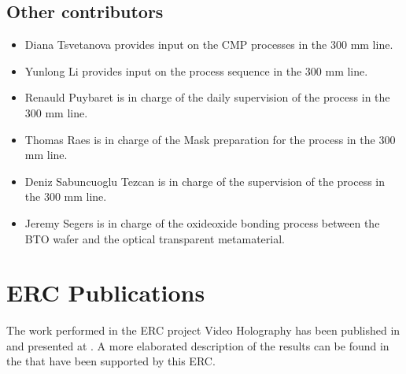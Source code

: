 \documentclass[a4paper,10pt,english,openany,oneside]{jupyterBook}
\begin{document}
\section{Other contributors}
\label{\detokenize{Team:other-contributors}}\begin{itemize}
\item {} 
\sphinxAtStartPar
Diana Tsvetanova provides input on the CMP processes in the 300 mm line.

\item {} 
\sphinxAtStartPar
Yunlong Li provides input on the process sequence in the 300 mm line.

\item {} 
\sphinxAtStartPar
Renauld Puybaret is in charge of the daily supervision of the process in the 300 mm line.

\item {} 
\sphinxAtStartPar
Thomas Raes is in charge of the Mask preparation for the process in the 300 mm line.

\item {} 
\sphinxAtStartPar
Deniz Sabuncuoglu Tezcan is in charge of the supervision of the process in the 300 mm line.

\item {} 
\sphinxAtStartPar
Jeremy Segers is in charge of the oxide\sphinxhyphen{}oxide bonding process between the BTO wafer and the optical transparent metamaterial.

\end{itemize}

\sphinxstepscope


\chapter{ERC Publications}
\label{\detokenize{Publications2:erc-publications}}\label{\detokenize{Publications2::doc}}
\sphinxAtStartPar
The work performed in the ERC project Video Holography has been published in {\hyperref[\detokenize{Publications2:journal-target}]{}} and presented at {\hyperref[\detokenize{Publications2:conferences-target}]{}}. A more elaborated description of the results can be found in the {\hyperref[\detokenize{Publications2:thesis-target}]{}} that have been supported by this ERC.
\end{document}
